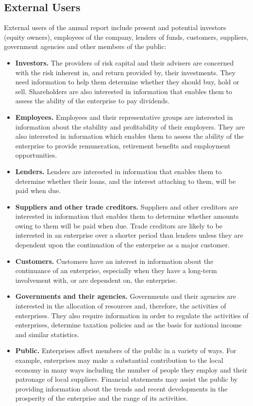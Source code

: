 \subsection{External Users}
External users of the annual report include present and potential investors (equity owners), employees of the company, lenders of funds, customers, suppliers, government agencies and other members of the public: 
\begin{itemize}
\item \textbf{Investors.} The providers of risk capital and their advisers are concerned with the risk inherent in, and return provided by, their investments.  They need information to help them determine whether they should buy, hold or sell.  Shareholders are also interested in information that enables them to assess the ability of the enterprise to pay dividends. 
\item \textbf{Employees.} Employees and their representative groups are interested in information about the stability and profitability of their employers.  They are also interested in information which enables them to assess the ability of the enterprise to provide remuneration, retirement benefits and employment opportunities. 
\item \textbf{Lenders.} Lenders are interested in information that enables them to determine whether their loans, and the interest attaching to them, will be paid when due. 
\item \textbf{Suppliers and other trade creditors.} Suppliers and other creditors are interested in information that enables them to determine whether amounts owing to them will be paid when due. Trade creditors are likely to be interested in an enterprise over a shorter period than lenders unless they are dependent upon the continuation of the enterprise as a major customer. 
\item \textbf{Customers.} Customers have an interest in information about the continuance of an enterprise, especially when they have a long-term involvement with, or are dependent on, the enterprise. 
\item \textbf{Governments and their agencies.} Governments and their agencies are interested in the allocation of resources and, therefore, the activities of enterprises.  They also require information in order to regulate the activities of enterprises, determine taxation policies and as the basis for national income and similar statistics. 
\item \textbf{Public.} Enterprises affect members of the public in a variety of ways.  For example, enterprises may make a substantial contribution to the local economy in many ways including the number of people they employ and their patronage of local suppliers.  Financial statements may assist the public by providing information about the trends and recent developments in the prosperity of the enterprise and the range of its activities.
\end{itemize}
